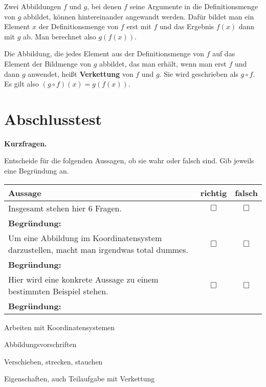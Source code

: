 \documentclass[solution]{uebungsblatt}
\begin{document}
\begin{remark}{}
\parpic[r]{}
Zwei Abbildungen $f$ und $g$, bei denen $f$ seine Argumente in die Definitionsmenge von $g$ abbildet, können hintereinander angewandt werden. Dafür bildet man ein Element $x$ der Definitionsmenge von $f$ erst mit $f$ und das Ergebnis $f(x)$ dann mit $g$ ab. Man berechnet also $g(f(x))$.

Die Abbildung, die jedes Element aus der Definitionsmenge von $f$ auf das Element der Bildmenge von $g$ abbildet, das man erhält, wenn man erst $f$ und dann $g$ anwendet, heißt \textbf{Verkettung} von $f$ und $g$. Sie wird geschrieben als $g\circ f$. Es gilt also $(g\circ f)(x)=g(f(x))$.
\end{remark}

\newpage

\section*{Abschlusstest}

\vspace*{5mm}

\begin{exercise}
    \textbf{Kurzfragen.} 
    
    Entscheide für die folgenden Aussagen, ob sie wahr oder falsch sind. Gib jeweils eine Begründung an.
    
    \begin{center}
        \begin{tabular}{p{}cc}
            \toprule
            Aussage & richtig & falsch\\\midrule
            Insgesamt stehen hier 6 Fragen. & $\Box$ & $\Box$ \\
            \multicolumn{3}{l}{\textbf{Begründung:}}\\\midrule
            Um eine Abbildung im Koordinatensystem darzustellen, macht man irgendwas total dummes. & $\Box$ & $\Box$ \\
            \multicolumn{3}{l}{\textbf{Begründung:}}\\\midrule
            Hier wird eine konkrete Aussage zu einem bestimmten Beispiel stehen. & $\Box$ & $\Box$ \\
            \multicolumn{3}{l}{\textbf{Begründung:}}\\\midrule
            \bottomrule
        \end{tabular}
    \end{center}
\end{exercise}

\begin{exercise}
    Arbeiten mit Koordinatensystemen
\end{exercise}

\begin{exercise}
    Abbildungsvorschriften
\end{exercise}

\begin{exercise}
    Verschieben, strecken, stauchen
\end{exercise}

\begin{exercise}
    Eigenschaften, auch Teilaufgabe mit Verkettung
\end{exercise}
\end{document}

